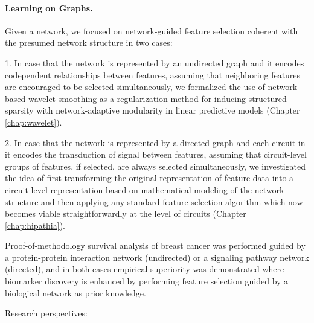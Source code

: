 \paragraph{Learning on Graphs.}

Given a network, we focused on network-guided feature selection coherent with the presumed network structure in two cases:
\begin{bulletList}
\item[1.] In case that the network is represented by an undirected graph and it encodes codependent relationships between features, assuming that neighboring features are encouraged to be selected simultaneously, we formalized the use of network-based wavelet smoothing as a regularization method for inducing structured sparsity with network-adaptive modularity in linear predictive models (Chapter \ref{chap:wavelet}).
\item[2.] In case that the network is represented by a directed graph and each circuit in it encodes the transduction of signal between features, assuming that circuit-level groups of features, if selected, are always selected simultaneously, we investigated the idea of first transforming the original representation of feature data into a circuit-level representation based on mathematical modeling of the network structure and then applying any standard feature selection algorithm which now becomes viable straightforwardly at the level of circuits (Chapter \ref{chap:hipathia}).
\end{bulletList}
Proof-of-methodology survival analysis of breast cancer was performed guided by a protein-protein interaction network (undirected) or a signaling pathway network (directed), and in both cases empirical superiority was demonstrated where biomarker discovery is enhanced by performing feature selection guided by a biological network as prior knowledge.




Research perspectives:

